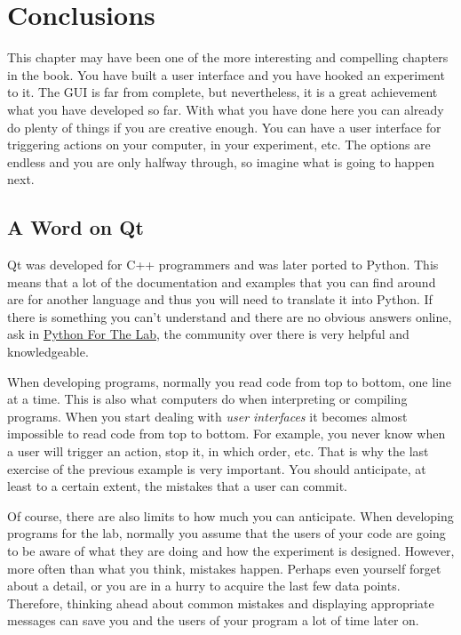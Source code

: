 \section{Conclusions}\label{conclusions}
This chapter may have been one of the more interesting and compelling
chapters in the book. You have built a user interface and you have
hooked an experiment to it. The {GUI} is far from complete, but
nevertheless, it is a great achievement what you have developed so far.
With what you have done here you can already do plenty of things if you
are creative enough. You can have a user interface for triggering
actions on your computer, in your experiment, etc. The options are
endless and you are only halfway through, so imagine what is going to
happen next.

\subsection{A Word on Qt}\label{a-word-onqt}
Qt was developed for C++ programmers and was later ported to Python.
This means that a lot of the documentation and examples that you can
find around are for another language and thus you will need to translate
it into Python. If there is something you can't understand and there are
no obvious answers online, ask in
\href{https://forum.pythonforthelab.com}{Python For The Lab}, the community over there is very helpful and knowledgeable.

When developing programs, normally you read code from top to bottom, one
line at a time. This is also what computers do when interpreting or
compiling programs. When you start dealing with \emph{user interfaces}
it becomes almost impossible to read code from top to bottom. For
example, you never know when a user will trigger an action, stop it, in
which order, etc. That is why the last exercise of the previous example
is very important. You should anticipate, at least to a certain extent,
the mistakes that a user can commit.

Of course, there are also limits to how much you can anticipate. When
developing programs for the lab, normally you assume that the users of
your code are going to be aware of what they are doing and how the
experiment is designed. However, more often than what you think,
mistakes happen. Perhaps even yourself forget about a detail, or you are
in a hurry to acquire the last few data points. Therefore, thinking
ahead about common mistakes and displaying appropriate messages can save
you and the users of your program a lot of time later on.

